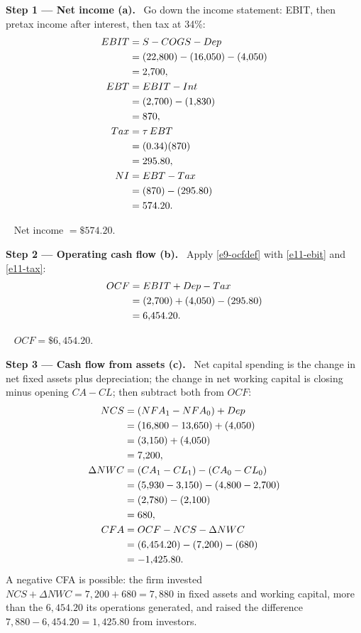 \documentclass[11pt,a4paper]{article}
\newcommand{\step}[2]{\par\medskip\noindent\textbf{Step #1 --- #2.}~}
\newcommand{\answer}[1]{\par\smallskip\noindent\fbox{\textbf{Answer #1.}}~}
\begin{document}
\step{1}{Net income (a)}
Go down the income statement: EBIT, then pretax income after interest, then tax at 34\%:
\begin{align}
  EBIT &= S - COGS - Dep \notag\\
  &= (22{,}800) - (16{,}050) - (4{,}050) \notag\\
  &= 2{,}700, \label{e11-ebit}\\
  EBT &= EBIT - Int \notag\\
  &= (2{,}700) - (1{,}830) \notag\\
  &= 870, \notag\\
  Tax &= \tau\, EBT \notag\\
  &= (0.34)(870) \notag\\
  &= 295.80, \label{e11-tax}\\
  NI &= EBT - Tax \notag\\
  &= (870) - (295.80) \notag\\
  &= 574.20. \notag
\end{align}

\answer{(a)} Net income $= \$574.20$.

\step{2}{Operating cash flow (b)}
Apply \eqref{e9-ocfdef} with \eqref{e11-ebit} and \eqref{e11-tax}:
\begin{align}
  OCF &= EBIT + Dep - Tax \notag\\
  &= (2{,}700) + (4{,}050) - (295.80) \notag\\
  &= 6{,}454.20. \label{e11-ocf}
\end{align}

\answer{(b)} $OCF = \$6{,}454.20$.

\step{3}{Cash flow from assets (c)}
Net capital spending is the change in net fixed assets plus depreciation; the change in net
working capital is closing minus opening $CA - CL$; then subtract both from $OCF$:
\begin{align}
  NCS &= (NFA_1 - NFA_0) + Dep \notag\\
  &= (16{,}800 - 13{,}650) + (4{,}050) \notag\\
  &= (3{,}150) + (4{,}050) \notag\\
  &= 7{,}200, \label{e11-ncs}\\
  \Delta NWC &= (CA_1 - CL_1) - (CA_0 - CL_0) \notag\\
  &= (5{,}930 - 3{,}150) - (4{,}800 - 2{,}700) \notag\\
  &= (2{,}780) - (2{,}100) \notag\\
  &= 680, \label{e11-nwc}\\
  CFA &= OCF - NCS - \Delta NWC \notag\\
  &= (6{,}454.20) - (7{,}200) - (680) \notag\\
  &= -1{,}425.80. \label{e11-cfa}
\end{align}
A negative CFA is possible: the firm invested $NCS + \Delta NWC = 7{,}200 + 680 = 7{,}880$ in fixed
assets and working capital, more than the $6{,}454.20$ its operations generated, and raised the
difference $7{,}880 - 6{,}454.20 = 1{,}425.80$ from investors.
\end{document}
